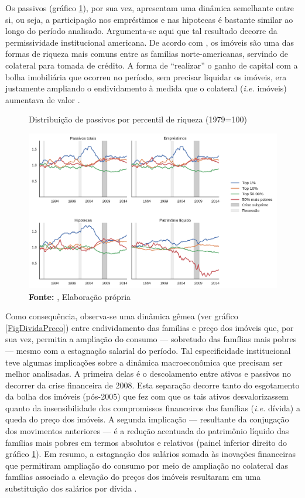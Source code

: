 Os passivos (gráfico \ref{FigDistPassivos}), por sua vez, apresentam uma dinâmica semelhante entre si, ou seja, a participação nos empréstimos e nas hipotecas  é bastante similar ao longo do período analisado.
Argumenta-se aqui que tal resultado decorre da permissividade institucional americana.
De acordo com \textcite{teixeira_uma_2011}, os imóveis são uma das formas de riqueza mais comuns entre as famílias norte-americanas, servindo de colateral para tomada de crédito. A forma de ``realizar'' o ganho de capital com a bolha imobiliária que ocorreu no período, sem precisar liquidar os imóveis, era justamente ampliando o endividamento à medida que o colateral (\textit{i.e.} imóveis) aumentava de valor \cite{teixeira_crescimento_2015}. 


\begin{figure}[H]
	\centering
	\caption{Distribuição de passivos por percentil de riqueza (1979=100)}
	\label{FigDistPassivos}
	\includegraphics[width=\textwidth]{../../Dados/Fatos_Estilizados/figs/Distribuicao_Passivos.png}
	\caption*{\textbf{Fonte:} \textcite{us_census_bureau_characteristics_2017}, Elaboração própria}
\end{figure}


Como consequência, observa-se uma dinâmica gêmea (ver gráfico \ref{FigDividaPreco}) entre endividamento das famílias e preço dos imóveis que, por sua vez, permitia a ampliação do consumo --- sobretudo das famílias mais pobres --- mesmo com a estagnação salarial do período.
Tal especificidade institucional teve algumas implicações sobre a dinâmica macroeconômica que precisam ser melhor analisadas.
A primeira delas é o descolamento entre ativos e passivos no decorrer da crise financeira de 2008.
Esta separação decorre tanto do esgotamento da bolha dos imóveis (pós-2005) que fez com que os tais ativos desvalorizassem quanto da insensibilidade dos compromissos financeiros das famílias (\textit{i.e.} dívida) a queda do preço dos imóveis.
A segunda implicação --- resultante da conjugação dos movimentos anteriores --- é a redução acentuada do patrimônio líquido das famílias mais pobres em termos absolutos e relativos (painel inferior direito do gráfico \ref{FigDistPassivos}).
Em resumo, a estagnação dos salários somada às inovações financeiras que permitiram ampliação do consumo por meio de ampliação no colateral das famílias associado a elevação do preços dos imóveis resultaram em uma substituição dos salários por dívida \cite{barba_rising_2009}.


